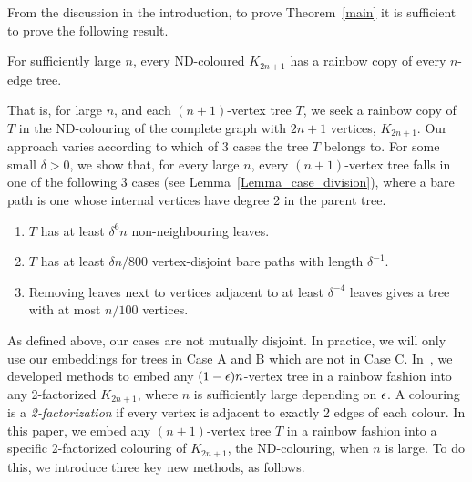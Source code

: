 
From the discussion in the introduction, to prove Theorem~\ref{main} it is sufficient to prove the following result.

\begin{theorem}\label{Theorem_Ringel_proof}
For sufficiently large $n$, every ND-coloured $K_{2n+1}$ has a rainbow copy of every $n$-edge tree.
\end{theorem}

That is, for large $n$, and each $(n+1)$-vertex tree $T$, we seek a rainbow copy of $T$ in the ND-colouring of the complete graph with $2n+1$ vertices, $K_{2n+1}$. Our approach varies according to which of 3 cases the tree $T$ belongs to. For some small $\delta>0$, we show that, for every large $n$, every $(n+1)$-vertex tree falls in one of the following 3 cases (see Lemma~\ref{Lemma_case_division}), where a bare path is one whose internal vertices have degree 2 in the parent tree.

\begin{enumerate}[label = \Alph{enumi}]
\item $T$ has at least $\delta^6 n$ non-neighbouring leaves.
\item $T$ has at least $\delta n/800$ vertex-disjoint bare paths with length $\delta^{-1}$.
\item Removing leaves next to vertices adjacent to at least $\delta^{-4}$ leaves gives a tree with at most
$n/100$ vertices.
\end{enumerate}

As defined above, our cases are not mutually disjoint. In practice, we will only use our embeddings for trees in Case A and B which are not in Case C. In~\cite{MPS}, we developed methods to embed any $(1-\epsilon)n$-vertex tree in a rainbow fashion into any 2-factorized $K_{2n+1}$, where $n$ is sufficiently large depending on $\epsilon$. A colouring is a \emph{2-factorization} if every vertex is adjacent to exactly 2 edges of each colour. In this paper, we embed any $(n+1)$-vertex tree $T$ in a rainbow fashion into a specific 2-factorized colouring of $K_{2n+1}$, the ND-colouring, when $n$ is large. To do this, we introduce three key new methods, as follows.

